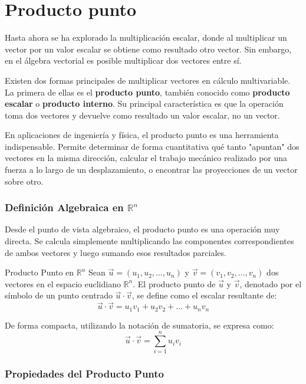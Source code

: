 \section{Producto punto}

Hasta ahora se ha explorado la multiplicación escalar, donde al multiplicar un vector por un valor escalar se obtiene como resultado otro vector. Sin embargo, en el álgebra vectorial es posible multiplicar dos vectores entre sí. 

Existen dos formas principales de multiplicar vectores en cálculo multivariable. La primera de ellas es el \textbf{producto punto}, también conocido como \textbf{producto escalar} o \textbf{producto interno}. Su principal característica es que la operación toma dos vectores y devuelve como resultado un valor escalar, no un vector.

En aplicaciones de ingeniería y física, el producto punto es una herramienta indispensable. Permite determinar de forma cuantitativa qué tanto "apuntan" dos vectores en la misma dirección, calcular el trabajo mecánico realizado por una fuerza a lo largo de un desplazamiento, o encontrar las proyecciones de un vector sobre otro.

\subsubsection{Definición Algebraica en $\mathbb{R}^n$}

Desde el punto de vista algebraico, el producto punto es una operación muy directa. Se calcula simplemente multiplicando las componentes correspondientes de ambos vectores y luego sumando esos resultados parciales.

\begin{mydefinition}{Producto Punto en $\mathbb{R}^n$}
Sean $\vec{u} = (u_1, u_2, \dots, u_n)$ y $\vec{v} = (v_1, v_2, \dots, v_n)$ dos vectores en el espacio euclidiano $\mathbb{R}^n$. El producto punto de $\vec{u}$ y $\vec{v}$, denotado por el símbolo de un punto centrado $\vec{u} \cdot \vec{v}$, se define como el escalar resultante de:
\[ \vec{u} \cdot \vec{v} = u_1v_1 + u_2v_2 + \dots + u_nv_n \]

De forma compacta, utilizando la notación de sumatoria, se expresa como:
\[ \vec{u} \cdot \vec{v} = \sum_{i=1}^{n} u_i v_i \]
\end{mydefinition}

\subsubsection{Propiedades del Producto Punto}

